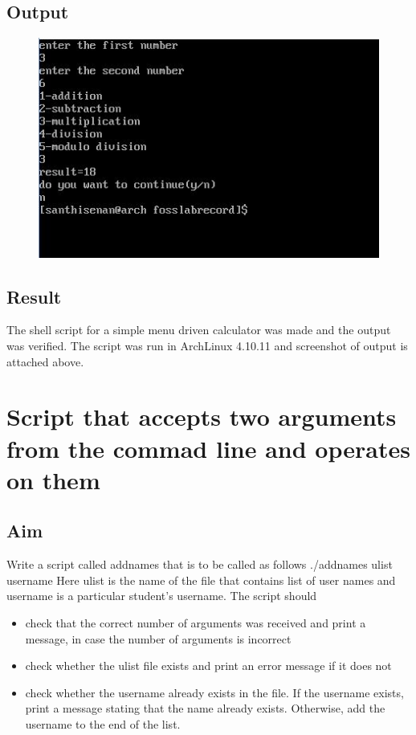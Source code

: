 \documentclass{article}
\begin{document}
\subsection{Output}
\begin{figure}[h!]
	\includegraphics[width=\linewidth]{./outputs/simplecalcnew.jpg}
\end{figure}


\subsection{Result}
The shell script for a simple menu driven calculator was made and the output was verified. The script was run in ArchLinux 4.10.11 and screenshot of output is attached above.

\begin{refsection}
\cite{shellbible}
\cite{shellbook}
\printbibliography
\end{refsection}

\newpage

\section{Script that accepts two arguments from the commad line and operates on them}
\subsection{Aim}
Write a script called addnames that is to be called as follows ./addnames ulist username
Here ulist is the name of the file that contains list of user names and username is a particular student's username. The script should
\begin{itemize}
\item check that the correct number of arguments was received and print a message, in case the number of arguments is incorrect
\item check whether the ulist file exists and print an error message if it does not
\item check whether the username already exists in the file. If the username exists, print a message stating that the name already exists. Otherwise, add the username to the end of
the list.
\end{itemize}
\end{document}
